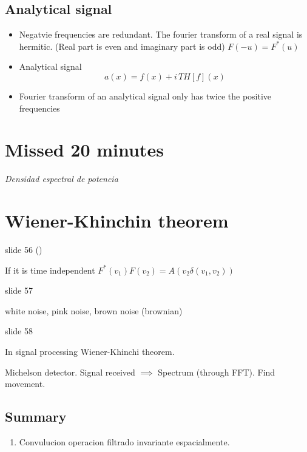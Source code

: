 \documentclass[../main/main.tex]{subfiles}
\begin{document}
\subsection{Analytical signal}

\begin{itemize}
	\item Negatvie frequencies are redundant. The fourier transform of a real signal is hermitic. (Real part is  even and imaginary part is odd) $F(-u)= F^{*}(u)$
	\item Analytical signal
	\begin{equation}
	a(x) = f(x) + i \, TH[f](x)
	\end{equation}
	\item Fourier transform of an analytical signal only has twice the positive frequencies

\end{itemize}

\section{Missed 20 minutes}

\emph{Densidad espectral de potencia}

\section{Wiener-Khinchin theorem}

slide 56 ()

If it is time independent $F^{*}(v_{1})F(v_{2}) = A(v_{2} \delta(v_{1}, v_{2}))$

slide 57

white noise, pink noise, brown noise (brownian)


slide 58

In signal processing Wiener-Khinchi theorem.

Michelson detector.  Signal received $\implies$ Spectrum (through FFT). Find movement.


\subsection{Summary}

\begin{enumerate}
	\item Convulucion operacion filtrado invariante espacialmente.

\end{enumerate}
\end{document}

